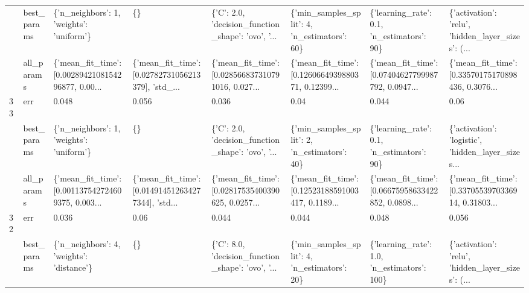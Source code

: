 \begin{tabular}{llllllll}
   & best\_params &           \{'n\_neighbors': 1, 'weights': 'uniform'\} &                                                 \{\} &  \{'C': 2.0, 'decision\_function\_shape': 'ovo', '... &       \{'min\_samples\_split': 4, 'n\_estimators': 60\} &         \{'learning\_rate': 0.1, 'n\_estimators': 90\} &  \{'activation': 'relu', 'hidden\_layer\_sizes': (... \\
   & all\_params &  \{'mean\_fit\_time': [0.0028942108154296877, 0.00... &  \{'mean\_fit\_time': [0.02782731056213379], 'std\_... &  \{'mean\_fit\_time': [0.028566837310791016, 0.027... &  \{'mean\_fit\_time': [0.1260664939880371, 0.12399... &  \{'mean\_fit\_time': [0.07404627799987792, 0.0947... &  \{'mean\_fit\_time': [0.33570175170898436, 0.3076... \\
33 & err &                                              0.048 &                                              0.056 &                                              0.036 &                                               0.04 &                                              0.044 &                                               0.06 \\
   & best\_params &           \{'n\_neighbors': 1, 'weights': 'uniform'\} &                                                 \{\} &  \{'C': 2.0, 'decision\_function\_shape': 'ovo', '... &       \{'min\_samples\_split': 2, 'n\_estimators': 40\} &         \{'learning\_rate': 0.1, 'n\_estimators': 90\} &  \{'activation': 'logistic', 'hidden\_layer\_sizes... \\
   & all\_params &  \{'mean\_fit\_time': [0.001137542724609375, 0.003... &  \{'mean\_fit\_time': [0.014914512634277344], 'std... &  \{'mean\_fit\_time': [0.02817535400390625, 0.0257... &  \{'mean\_fit\_time': [0.12523188591003417, 0.1189... &  \{'mean\_fit\_time': [0.06675958633422852, 0.0898... &  \{'mean\_fit\_time': [0.3370553970336914, 0.31803... \\
32 & err &                                              0.036 &                                               0.06 &                                              0.044 &                                              0.044 &                                              0.048 &                                              0.056 \\
   & best\_params &          \{'n\_neighbors': 4, 'weights': 'distance'\} &                                                 \{\} &  \{'C': 8.0, 'decision\_function\_shape': 'ovo', '... &       \{'min\_samples\_split': 4, 'n\_estimators': 20\} &        \{'learning\_rate': 1.0, 'n\_estimators': 100\} &  \{'activation': 'relu', 'hidden\_layer\_sizes': (... \\

\end{tabular}
